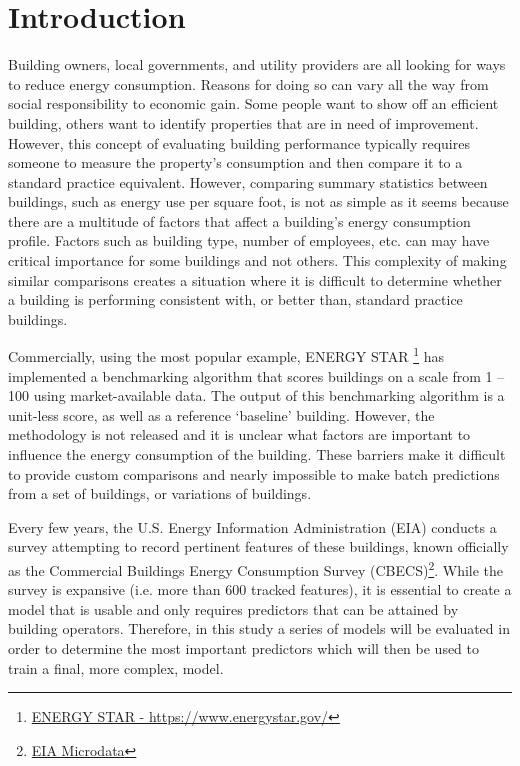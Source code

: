 \section{Introduction}
\label{sec:introduction}

Building owners, local governments, and utility providers are all looking for ways to reduce energy consumption.  Reasons for doing so can vary all the way from social responsibility to economic gain.  Some people want to show off an efficient building, others want to identify properties that are in need of improvement.  However, this concept of evaluating building performance typically requires someone to measure the property's consumption and then compare it to a standard practice equivalent.  However, comparing summary statistics between buildings, such as energy use per square foot, is not as simple as it seems because there are a multitude of factors that affect a building’s energy consumption profile.  Factors such as building type, number of employees, etc. can may have critical importance for some buildings and not others.  This complexity of making similar comparisons creates a situation where it is difficult to determine whether a building is performing consistent with, or better than, standard practice buildings.

Commercially, using the most popular example, ENERGY STAR \footnote{\href{https://www.energystar.gov/}{ENERGY STAR - \url{https://www.energystar.gov/}}} has implemented a benchmarking algorithm that scores buildings on a scale from 1 – 100 using market-available data.  The output of this benchmarking algorithm is a unit-less score, as well as a reference ‘baseline’ building.  However, the methodology is not released and it is unclear what factors are important to influence the energy consumption of the building.  These barriers make it difficult to provide custom comparisons and nearly impossible to make batch predictions from a set of buildings, or variations of buildings.

Every few years, the U.S. Energy Information Administration (EIA) conducts a survey attempting to record pertinent features of these buildings, known officially as the Commercial Buildings Energy Consumption Survey (CBECS)\footnote{\href{https://www.eia.gov/consumption/commercial/data/2012/index.php?view=microdata}{EIA Microdata}}.  While the survey is expansive (i.e. more than 600 tracked features), it is essential to create a model that is usable and only requires predictors that can be attained by building operators.  Therefore, in this study a series of models will be evaluated in order to determine the most important predictors which will then be used to train a final, more complex, model.
